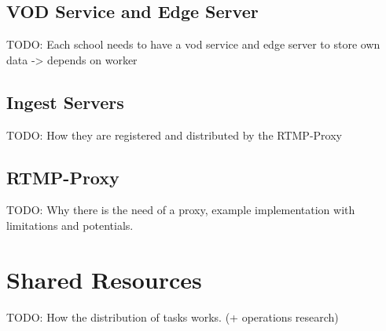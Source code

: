 \subsection{VOD Service and Edge Server}
TODO: Each school needs to have a vod service and edge server to store own data -> depends on worker

\subsection{Ingest Servers}
TODO: How they are registered and distributed by the RTMP-Proxy

\subsection{RTMP-Proxy}
TODO: Why there is the need of a proxy, example implementation with limitations and potentials.

\section{Shared Resources}
TODO: How the distribution of tasks works. (+ operations research)